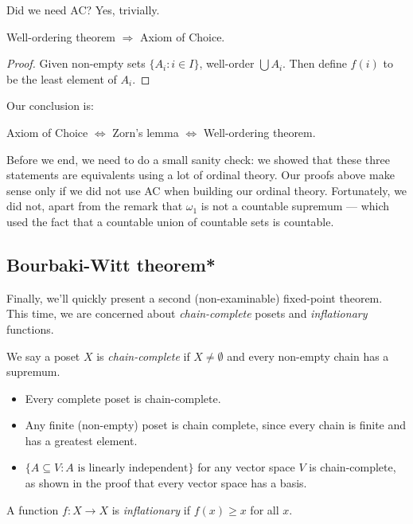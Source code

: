 \documentclass[a4paper]{article}
\begin{document}
Did we need AC? Yes, trivially.
\begin{thm}
  Well-ordering theorem $\Rightarrow $ Axiom of Choice.
\end{thm}

\begin{proof}
  Given non-empty sets $\{A_i: i\in I\}$, well-order $\bigcup A_i$. Then define $f(i)$ to be the least element of $A_i$.
\end{proof}
Our conclusion is:
\begin{center}
  Axiom of Choice $\Leftrightarrow$ Zorn's lemma $\Leftrightarrow$ Well-ordering theorem.
\end{center}
Before we end, we need to do a small sanity check: we showed that these three statements are equivalents using a lot of ordinal theory. Our proofs above make sense only if we did not use AC when building our ordinal theory. Fortunately, we did not, apart from the remark that $\omega_1$ is not a countable supremum --- which used the fact that a countable union of countable sets is countable.

\subsection{Bourbaki-Witt theorem*}
Finally, we'll quickly present a second (non-examinable) fixed-point theorem. This time, we are concerned about \emph{chain-complete} posets and \emph{inflationary} functions.

\begin{defi}
  We say a poset $X$ is \emph{chain-complete} if $X \not=\emptyset$ and every non-empty chain has a supremum.
\end{defi}

\begin{eg}\leavevmode
  \begin{itemize}
    \item Every complete poset is chain-complete.
    \item Any finite (non-empty) poset is chain complete, since every chain is finite and has a greatest element.
    \item $\{A\subseteq V: A\text{ is linearly independent}\}$ for any vector space $V$ is chain-complete, as shown in the proof that every vector space has a basis.
  \end{itemize}
\end{eg}

\begin{defi}
  A function $f: X\to X$ is \emph{inflationary} if $f(x) \geq x$ for all $x$.
\end{defi}
\end{document}
